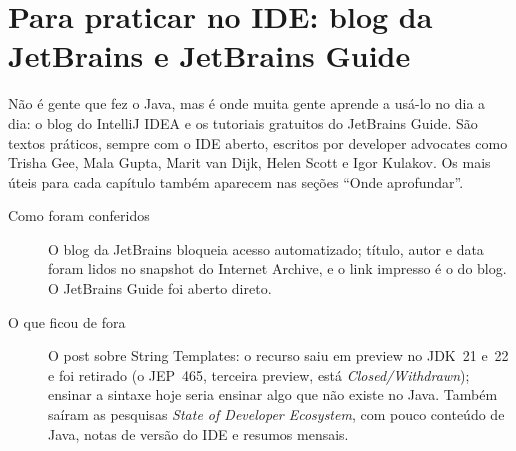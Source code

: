 \section{Para praticar no IDE: blog da JetBrains e JetBrains Guide}
\label{ap:jetbrains}

Não é gente que fez o Java, mas é onde muita gente aprende a usá-lo no dia
a dia: o blog do IntelliJ IDEA e os tutoriais gratuitos do JetBrains Guide.
São textos práticos, sempre com o IDE aberto, escritos por developer
advocates como Trisha Gee, Mala Gupta, Marit van Dijk, Helen Scott e Igor
Kulakov. Os mais úteis para cada capítulo também aparecem nas seções
\enquote{Onde aprofundar}.

\nocite{artigo:jetbrains-writing-tests-junit5,
  artigo:jetbrains-migrating-junit4-junit5,
  artigo:jetbrains-testcontainers-spring-boot,
  artigo:jetbrains-ai-agent-flaky-tests,
  curso:jetbrains-guide-writing-junit5-tests,
  curso:jetbrains-guide-writing-tests-spock,
  curso:jetbrains-guide-testing-debugging,
  artigo:jetbrains-pattern-matching-5-examples,
  artigo:jetbrains-evolution-switch-java,
  artigo:jetbrains-project-loom-intellij,
  artigo:jetbrains-java-25-lts,
  artigo:jetbrains-do-you-really-know-java,
  artigo:jetbrains-java-still-relevant,
  artigo:jetbrains-thread-dumps-virtual-threads,
  artigo:jetbrains-debugging-java-intellij,
  artigo:jetbrains-sources-bytecode-debugging,
  artigo:jetbrains-println-debugging,
  artigo:jetbrains-debug-without-breakpoints,
  artigo:jetbrains-intellij-profiler,
  artigo:jetbrains-profiling-parrot-party,
  artigo:jetbrains-get-started-profiling,
  artigo:jetbrains-5-profiling-features,
  curso:jetbrains-guide-javax-jakarta,
  artigo:jetbrains-java-best-practices,
  artigo:jetbrains-code-smells-null,
  artigo:jetbrains-code-smells-mutation,
  artigo:jetbrains-code-smells-if,
  artigo:jetbrains-basic-refactorings,
  artigo:jetbrains-3-ways-refactor,
  curso:jetbrains-guide-refactoring}

\begin{description}
\item[Como foram conferidos] O blog da JetBrains bloqueia acesso
  automatizado; título, autor e data foram lidos no snapshot do Internet
  Archive, e o link impresso é o do blog. O JetBrains Guide foi aberto
  direto.
\item[O que ficou de fora] O post sobre String Templates: o recurso saiu
  em preview no JDK~21 e~22 e foi retirado (o JEP~465, terceira preview,
  está \emph{Closed/Withdrawn}); ensinar a sintaxe hoje seria ensinar algo
  que não existe no Java. Também saíram as pesquisas \emph{State of
  Developer Ecosystem}, com pouco conteúdo de Java, notas de versão do IDE e
  resumos mensais.
\end{description}

